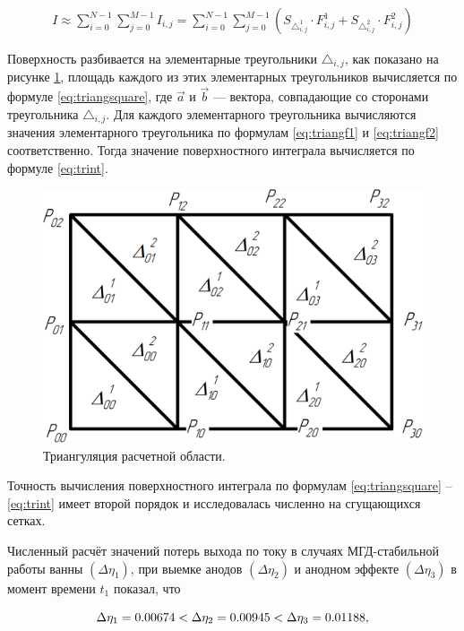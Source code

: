 \documentclass[]{pmi}
\begin{document}
\begin{align}\label{eq:trint}
I \approx \sum_{i=0}^{N-1} \sum_{j=0}^{M-1} I_{i,j} = \sum_{i=0}^{N-1} \sum_{j=0}^{M-1} (S_{\triangle_{i,j}^1} \cdot F_{i,j}^1 + S_{\triangle_{i,j}^2} \cdot F_{i,j}^2)
\end{align}

Поверхность разбивается на элементарные треугольники $\triangle_{i,j}$, как показано на рисунке \ref{fig:triangles}, площадь каждого из этих элементарных треугольников вычисляется по формуле \ref{eq:triangsquare}, где $\overrightarrow{a}$ и $\overrightarrow{b}$ — вектора, совпадающие со сторонами треугольника $\triangle_{i,j}$. Для каждого элементарного треугольника вычисляются значения элементарного треугольника по формулам \ref{eq:triangf1} и \ref{eq:triangf2} соответственно. Тогда значение поверхностного интеграла вычисляется по формуле \ref{eq:trint}.

\begin{figure}[H]
    \centering
    \includegraphics[width=150mm]{triangul.png}
    \caption{Триангуляция расчетной области.}
    \label{fig:triangles} 
\end{figure}

Точность вычисления поверхностного интеграла по формулам \ref{eq:triangsquare} – \ref{eq:trint} имеет второй порядок и исследовалась численно на сгущающихся сетках.

Численный расчёт значений потерь выхода по току в случаях МГД-стабильной работы ванны $(\Delta\eta_1)$, при выемке анодов $(\Delta\eta_2)$ и анодном эффекте $(\Delta\eta_3)$ в момент времени $t_1$ показал, что 

\begin{equation}
\Delta\eta_1 = 0.00674 < \Delta\eta_2 = 0.00945 < \Delta\eta_3 = 0.01188, \notag
\end{equation}
\end{document}

